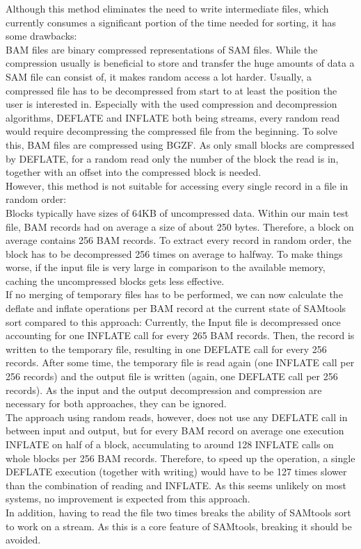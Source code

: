 Although this method eliminates the need to write intermediate files, which currently consumes a significant portion of the time needed for sorting, it has some drawbacks: \\
BAM files are binary compressed representations of SAM files. While the compression usually is beneficial to store and transfer the huge amounts of data a SAM file can consist of, it makes random access a lot harder. Usually, a compressed file has to be decompressed from start to at least the position the user is interested in. Especially with the used compression and decompression algorithms, DEFLATE and INFLATE both being streams, every random read would require decompressing the compressed file from the beginning. To solve this, BAM files are compressed using BGZF. As only small blocks are compressed by DEFLATE, for a random read only the number of the block the read is in, together with an offset into the compressed block is needed. \\
However, this method is not suitable for accessing every single record in a file in random order: \\
Blocks typically have sizes of 64KB of uncompressed data. Within our main test file, BAM records had on average a size of about 250 bytes. Therefore, a block on average contains 256 BAM records. To extract every record in random order, the block has to be decompressed 256 times on average to halfway. To make things worse, if the input file is very large in comparison to the available memory, caching  the uncompressed blocks gets less effective. \\
If no merging of temporary files has to be performed, we can now calculate the deflate and inflate operations per BAM record at the current state of SAMtools sort compared to this approach: Currently, the Input file is decompressed once accounting for one INFLATE call for every 265 BAM records. Then, the record is written to the temporary file, resulting in one DEFLATE call for every 256 records. After some time, the temporary file is read again (one INFLATE call per 256 records) and the output file is written (again, one DEFLATE call per 256 records). As the input and the output decompression and compression are necessary for both approaches, they can be ignored. \\
The approach using random reads, however, does not use any DEFLATE call in between input and output, but for every BAM record on average one execution INFLATE on half of a block, accumulating to around 128 INFLATE calls on whole blocks per 256 BAM records. Therefore, to speed up the operation, a single DEFLATE execution (together with writing) would have to be 127 times slower than the combination of reading and INFLATE. As this seems unlikely on most systems, no improvement is expected from this approach. \\
In addition, having to read the file two times breaks the ability of SAMtools sort to work on a stream. As this is a core feature of SAMtools, breaking it should be avoided.